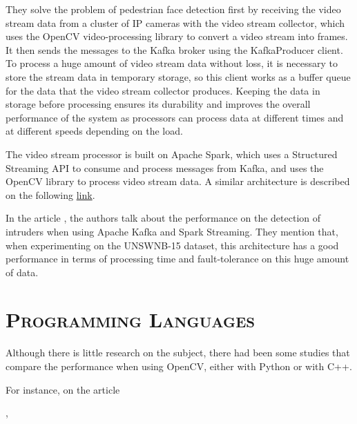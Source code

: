\documentclass[10pt,letterpaper]{article}
\newcommand{\ssection}[1]{%
  \section*{\normalfont\scshape #1}}
\begin{document}
They solve the problem of pedestrian face detection first by receiving the video stream data from a cluster of IP cameras with the video stream collector, which uses the OpenCV video-processing library to convert a video stream into frames. It then sends the messages to the Kafka broker using the KafkaProducer client. To process a huge amount of video stream data without loss, it is necessary to store the stream data in temporary storage, so this client works as a buffer queue for the data that the video stream collector produces. Keeping the data in storage before processing ensures its durability and improves the overall performance of the system as processors can process data at different times and at different speeds depending on the load.
  
The video stream processor is built on Apache Spark, which uses a Structured Streaming API to consume and process messages from Kafka, and uses the OpenCV library to process video stream data. A similar architecture is described on the following \href{https://www.infoq.com/articles/video-stream-analytics-opencv/}{link}.

In the article \cite{Tun2019b}, the authors talk about the performance on the detection of intruders when using Apache Kafka and Spark Streaming. They mention that, when experimenting on the UNSWNB-15 dataset, this architecture has a good performance in terms of processing time and fault-tolerance on this huge amount of data.

\ssection{Programming Languages}

Although there is little research on the subject, there had been some studies that compare the performance when using OpenCV,	 either with Python or with C++. 

For instance, on the article \cite{Fatih2016}

\cite{Susu2016}, \cite{Wang2012b}\cite{Chintapalli2016b}\cite{Yang2017b}




\end{document}
